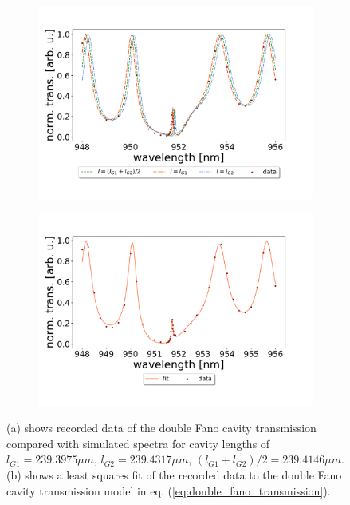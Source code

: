 \begin{figure}[h!]
    \centering
    \begin{subfigure}[b]{0.49\textwidth}
        \centering
        \includegraphics[width=\textwidth]{figures/results/238um_long_scan_sim_comparison.pdf}
        \caption{}
        \label{fig:238um_long_scan_sim_comparison}
    \end{subfigure}
    \begin{subfigure}[b]{0.49\textwidth}
        \centering
        \includegraphics[width=\textwidth]{figures/results/238um_long_scan_fit.pdf}
        \caption{}
        \label{fig:238um_long_scan_fit}
    \end{subfigure}
    \caption{(a) shows recorded data of the double Fano cavity transmission compared with simulated spectra for cavity lengths of $l_{G1} = 239.3975 \mu m$, $l_{G2} = 239.4317 \mu m$, $(l_{G1} + l_{G2})/2 = 239.4146 \mu m$. (b) shows a least squares fit of the recorded data to the double Fano cavity transmission model in eq. (\ref{eq:double_fano_transmission}).}
    \label{fig:238um_cavity_fit_and_sim}
\end{figure}

